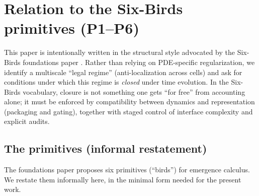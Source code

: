 \documentclass[11pt]{article}
\begin{document}
 \section{Relation to the Six-Birds primitives (P1--P6)}\label{sec:six-birds}

This paper is intentionally written in the structural style advocated by the Six-Birds foundations paper \cite{Tsiokos2026SixBirds}.
Rather than relying on PDE-specific regularization, we identify a multiscale ``legal regime'' (anti-localization across cells) and ask for conditions under which this regime is \emph{closed} under time evolution.
In the Six-Birds vocabulary, closure is not something one gets ``for free'' from accounting alone; it must be enforced by compatibility between dynamics and representation (packaging and gating), together with staged control of interface complexity and explicit audits.

\subsection{The primitives (informal restatement)}

The foundations paper \cite{Tsiokos2026SixBirds} proposes six primitives (``birds'') for emergence calculus.
We restate them informally here, in the minimal form needed for the present work.
\end{document}
